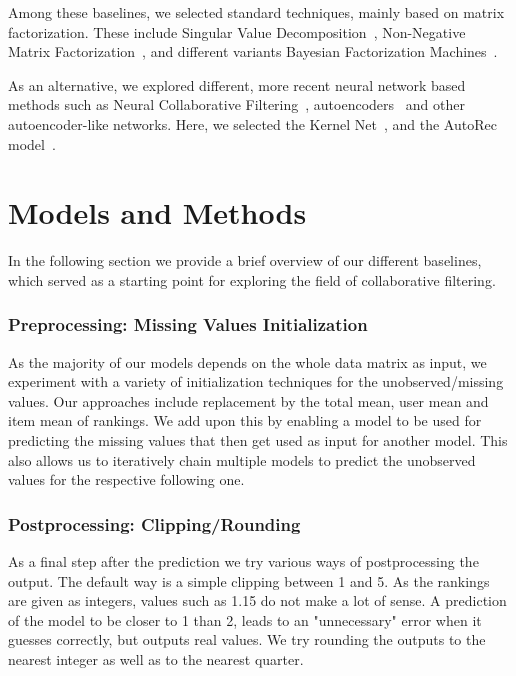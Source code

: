\documentclass[10pt,conference,compsocconf]{IEEEtran}
\begin{document}
    Among these baselines, we selected standard techniques, mainly based on matrix factorization.
    These include Singular Value Decomposition~\cite{svd}, Non-Negative Matrix Factorization~\cite{6165290}, and different variants Bayesian Factorization Machines~\cite{freudenthaler_bayesian_2011, salakhutdinov_bayesian_2008}.

    As an alternative, we explored different, more recent neural network based methods such as Neural Collaborative Filtering~\cite{DBLP:journals/corr/abs-1708-05031}, autoencoders~\cite{inproceedings} and other autoencoder-like networks.
    Here, we selected the Kernel Net~\cite{pmlr-v80-muller18a}, and the AutoRec model~\cite{inproceedings}.


    \section{Models and Methods}
    In the following section we provide a brief overview of our different baselines, which served as a starting point for exploring the field of collaborative filtering.

    \subsubsection{Preprocessing: Missing Values Initialization}\label{subsub:missing_init}
    As the majority of our models depends on the whole data matrix as input, we experiment with a variety of initialization techniques for the unobserved/missing values.
    Our approaches include replacement by the total mean, user mean and item mean of rankings.
    We add upon this by enabling a model to be used for predicting the missing values that then get used as input for another model.
    This also allows us to iteratively chain multiple models to predict the unobserved values for the respective following one.

    \subsubsection{Postprocessing: Clipping/Rounding}
    As a final step after the prediction we try various ways of postprocessing the output.
    The default way is a simple clipping between 1 and 5.
    As the rankings are given as integers, values such as 1.15 do not make a lot of sense.
    A prediction of the model to be closer to 1 than 2, leads to an "unnecessary" error when it guesses correctly, but outputs real values.
    We try rounding the outputs to the nearest integer as well as to the nearest quarter.
\end{document}
